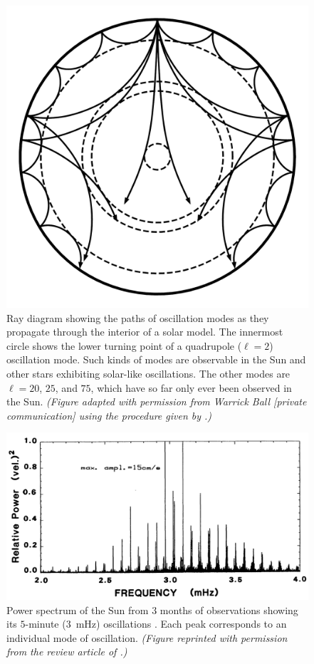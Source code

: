 \begin{figure}[t!]%
    \centering
    \vspace*{-0.35cm}
    \includegraphics[width=0.73\textwidth%
        ]{figs/pulse/modelS_rays.pdf}
    \caption[Ray path diagram for solar oscillation modes]{Ray diagram showing the paths of oscillation modes as they propagate through the interior of a solar model. 
    The innermost circle shows the lower turning point of a quadrupole (${\ell=2}$) oscillation mode. 
    Such kinds of modes are observable in the Sun and other stars exhibiting solar-like oscillations. 
    The other modes are ${\ell=20}$, $25$, and $75$, which have so far only ever been observed in the Sun. 
    \emph{(Figure adapted with permission from Warrick Ball [private communication] using the procedure given by \citealt{2000PhDT.........9G}.)}
    \label{fig:rays}}
\end{figure}


\begin{figure}
    \centering
    \includegraphics[width=\textwidth]{pics/solar-power-spectrum.png}
    \caption[Historical solar power spectrum]{Power spectrum of the Sun from $3$ months of observations showing its $5$-minute ($3$~mHz) oscillations \citep{1981SoPh...74...51C}. 
    Each peak corresponds to an individual mode of oscillation. 
    \emph{(Figure reprinted with permission from the review article of \citealt{1984ARA&A..22..593D}.)}
    \label{fig:solar-power-spectrum}}
\end{figure}


